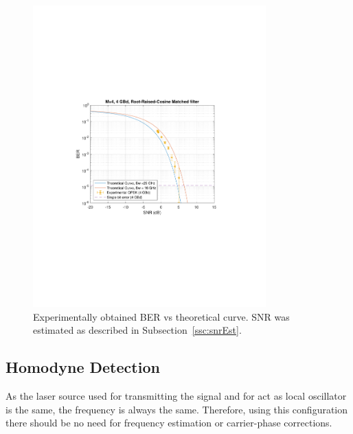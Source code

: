 \begin{refsection}
\begin{figure}[H]
	\centering
	\includegraphics[clip, trim=4cm 8cm 4cm 8cm,
	width=0.8\textwidth]{./sdf/m_qam_system/figures/expResults/4GBdBER20180611.pdf}
	\caption{Experimentally obtained BER vs theoretical curve. SNR was estimated as described in Subsection~\ref{ssc:snrEst}.}
	\label{fig:4GBdFinalBERcurve}
\end{figure}



\subsection{Homodyne Detection}
As the laser source used for transmitting the signal and for act as local oscillator is the same, the frequency is always the same. Therefore, using this configuration there should be no need for frequency estimation or carrier-phase corrections.

\end{refsection}
